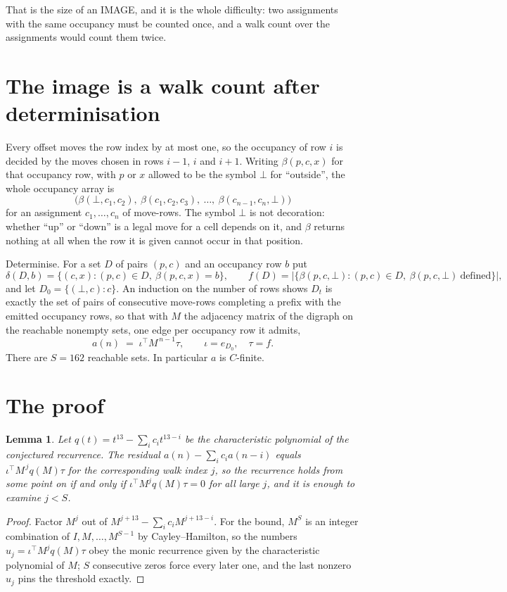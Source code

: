 \documentclass[11pt,a4paper]{article}
\theoremstyle{plain}
\newtheorem{lemma}[theorem]{Lemma}
\theoremstyle{definition}
\begin{document}
That is the size of an IMAGE, and it is the whole difficulty: two assignments with the same
occupancy must be counted once, and a walk count over the assignments would count them twice.

\section{The image is a walk count after determinisation}

Every offset moves the row index by at most one, so the occupancy of row $i$ is decided by the
moves chosen in rows $i-1$, $i$ and $i+1$. Writing $\beta(p,c,x)$ for that occupancy row, with
$p$ or $x$ allowed to be the symbol $\bot$ for ``outside'', the whole occupancy array is
\[
\bigl(\beta(\bot,c_1,c_2),\ \beta(c_1,c_2,c_3),\ \dots,\ \beta(c_{n-1},c_n,\bot)\bigr)
\]
for an assignment $c_1,\dots,c_n$ of move-rows. The symbol $\bot$ is not decoration: whether
``up'' or ``down'' is a legal move for a cell depends on it, and $\beta$ returns nothing at all
when the row it is given cannot occur in that position.

Determinise. For a set $D$ of pairs $(p,c)$ and an occupancy row $b$ put
\[
\delta(D,b)=\{(c,x):(p,c)\in D,\ \beta(p,c,x)=b\},\qquad
f(D)=\bigl|\{\beta(p,c,\bot):(p,c)\in D,\ \beta(p,c,\bot)\ \text{defined}\}\bigr| ,
\]
and let $D_0=\{(\bot,c):c\}$. An induction on the number of rows shows $D_t$ is exactly the
set of pairs of consecutive move-rows completing a prefix with the emitted occupancy rows, so
that with $M$ the adjacency matrix of the digraph on the reachable nonempty sets, one edge per
occupancy row it admits,
\[
a(n)\;=\;\iota^{\!\top}M^{\,n-1}\tau,\qquad \iota=e_{D_0},\quad \tau=f .
\]
There are $S=162$ reachable sets. In particular $a$ is $C$-finite.

\section{The proof}

\begin{lemma}\label{lem:crit}
Let $q(t)=t^{13}-\sum_i c_it^{13-i}$ be the characteristic polynomial of the
conjectured recurrence. The residual $a(n)-\sum_ic_ia(n-i)$ equals
$\iota^{\!\top}M^{\,j}q(M)\tau$ for the corresponding walk index $j$, so the recurrence
holds from some point on if and only if $\iota^{\!\top}M^{j}q(M)\tau=0$ for all large $j$,
and it is enough to examine $j<S$.
\end{lemma}

\begin{proof}
Factor $M^{j}$ out of $M^{j+13}-\sum_ic_iM^{j+13-i}$. For the bound, $M^{S}$
is an integer combination of $I,M,\dots,M^{S-1}$ by Cayley--Hamilton, so the numbers
$u_j=\iota^{\!\top}M^{j}q(M)\tau$ obey the monic recurrence given by the characteristic
polynomial of $M$; $S$ consecutive zeros force every later one, and the last nonzero $u_j$
pins the threshold exactly.
\end{proof}
\end{document}
